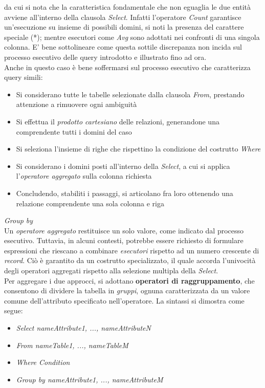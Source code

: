 \documentclass{article}
\begin{document}
da cui si nota che la caratteristica fondamentale che non eguaglia le due entità avviene all'interno della clausola \textit{Select}. Infatti l'operatore \textit{Count} garantisce un'esecuzione su insieme di possibili domini, si noti la presenza del carattere speciale (*); mentre esecutori come \textit{Avg} sono adottati nei confronti di una singola colonna. E' bene sottolineare come questa sottile discrepanza non incida sul processo esecutivo delle query introdotto e illustrato fino ad ora.\vspace*{14pt}\\
Anche in questo caso è bene soffermarsi sul processo esecutivo che caratterizza query simili:
\begin{itemize}[label={-}]
    \itemsep0em
    \item Si considerano tutte le tabelle selezionate dalla clausola \textit{From}, prestando attenzione a rimuovere ogni ambiguità
    \item Si effettua il \textit{prodotto cartesiano} delle relazioni, generandone una comprendente tutti i domini del caso
    \item Si seleziona l'insieme di righe che rispettino la condizione del costrutto \textit{Where}
    \item Si considerano i domini posti all'interno della \textit{Select}, a cui si applica l'\textit{operatore aggregato} sulla colonna richiesta
    \item Concludendo, stabiliti i passaggi, si articolano fra loro ottenendo una relazione comprendente una sola colonna e riga
\end{itemize}
\textit{Group by}\\
Un \textit{operatore aggregato} restituisce un solo valore, come indicato dal processo esecutivo. Tuttavia, in alcuni contesti, potrebbe essere richiesto di formulare espressioni che riescano a combinare \textit{esecutori} rispetto ad un numero crescente di \textit{record}. Ciò è garantito da un costrutto specializzato, il quale accorda l'univocità degli operatori aggregati rispetto alla selezione multipla della \textit{Select}.\vspace*{14pt}\\
Per aggregare i due approcci, si adottano \textbf{operatori di raggruppamento}, che consentono di dividere la tabella in \textit{gruppi}, ognuna caratterizzata da un valore comune dell'attributo specificato nell'operatore. La sintassi si dimostra come segue:
\begin{itemize}[label={ }, leftmargin=1cm]
    \itemsep0em
    \item \textit{Select nameAttribute1, ..., nameAttributeN}
    \item \textit{From nameTable1, ..., nameTableM}
    \item \textit{Where Condition}
    \item \textit{Group by nameAttribute1, ..., nameAttributeM}
\end{itemize}
\end{document}
